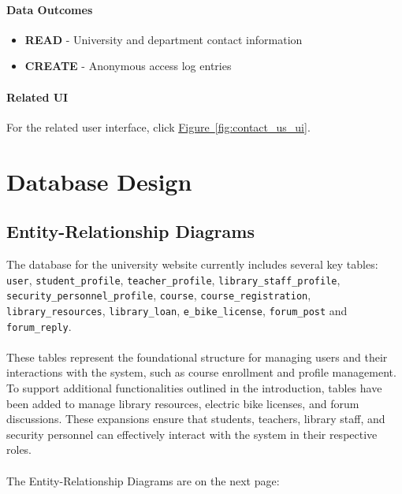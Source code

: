 \documentclass[12pt]{article}
\begin{document}
\paragraph{Data Outcomes}
\begin{itemize}
    \item \textbf{READ} - University and department contact information
    \item \textbf{CREATE} - Anonymous access log entries
\end{itemize}

\paragraph{Related UI}
For the related user interface, click \hyperref[fig:contact_us_ui]{Figure~\ref*{fig:contact_us_ui}}.


\newpage
\section{Database Design}

\subsection{Entity-Relationship Diagrams}
The database for the university website currently includes several key tables: \texttt{user},
\texttt{student\_profile}, \texttt{teacher\_profile}, \texttt{library\_staff\_profile},
\texttt{security\_personnel\_profile}, \texttt{course}, \texttt{course\_registration}, \texttt{library\_resources},
\texttt{library\_loan}, \texttt{e\_bike\_license}, \texttt{forum\_post} and \texttt{forum\_reply}.\\ \\
These tables represent the foundational structure for managing users and their interactions with the system,
such as course enrollment and profile management. To support additional functionalities outlined in the introduction,
tables have been added to manage library resources, electric bike licenses, and forum discussions.
These expansions ensure that students, teachers, library staff, and security personnel can effectively interact
with the system in their respective roles. \\ \\
The Entity-Relationship Diagrams are on the next page:
\end{document}
